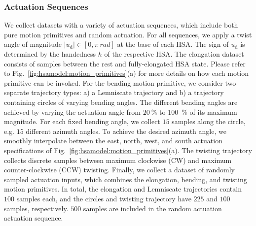 \subsubsection{Actuation Sequences}\label{ssub:hsamodel:hsa_rod_kinematics:actuation_sequences}
We collect datasets with a variety of actuation sequences, which include both pure motion primitives and random actuation. 
For all sequences, we apply a twist angle of magnitude  $|u_\mathrm{d}| \in [0, \pi \: \si{rad}]$ at the base of each \gls{HSA}. The sign of $u_\mathrm{d}$ is determined by the handedness $h$ of the respective \gls{HSA}.
The elongation dataset consists of samples between the rest and fully-elongated \gls{HSA} state. Please refer to Fig.~\ref{fig:hsamodel:motion_primitives}(a) for more details on how each motion primitive can be invoked.
For the bending motion primitive, we consider two separate trajectory types: a) a Lemniscate trajectory and b) a trajectory containing circles of varying bending angles. The different bending angles are achieved by varying the actuation angle from $\SI{20}{\percent}$ to \SI{100}{\percent} of its maximum magnitude. For each fixed bending angle, we collect $15$ samples along the circle, e.g. $15$ different azimuth angles.
To achieve the desired azimuth angle, we smoothly interpolate between the east, north, west, and south actuation specifications of Fig.~\ref{fig:hsamodel:motion_primitives}(a).
The twisting trajectory collects discrete samples between maximum clockwise (CW) and maximum counter-clockwise (CCW) twisting.
Finally, we collect a dataset of randomly sampled actuation inputs, which combines the elongation, bending, and twisting motion primitives. %
In total, the elongation and Lemniscate trajectories contain $100$ samples each, and the circles and twisting trajectory have $225$ and $100$ samples, respectively. $500$ samples are included in the random actuation actuation sequence.



